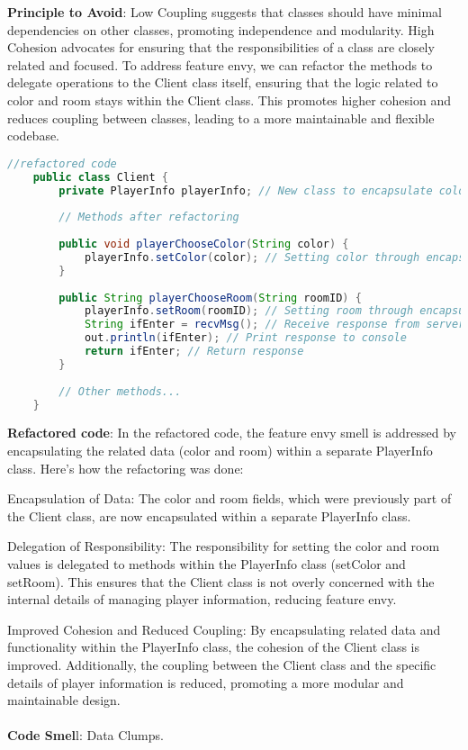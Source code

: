 \documentclass[12pt]{article}
\numberwithin{table}{section}
\begin{document}
\textbf{Principle to Avoid}: Low Coupling suggests that classes should have minimal dependencies on other classes, promoting independence and modularity. High Cohesion advocates for ensuring that the responsibilities of a class are closely related and focused. To address feature envy, we can refactor the methods to delegate operations to the Client class itself, ensuring that the logic related to color and room stays within the Client class. This promotes higher cohesion and reduces coupling between classes, leading to a more maintainable and flexible codebase.
\begin{lstlisting}[language=Java]
	//refactored code
	public class Client {
		private PlayerInfo playerInfo; // New class to encapsulate color and room
		
		// Methods after refactoring
		
		public void playerChooseColor(String color) {
			playerInfo.setColor(color); // Setting color through encapsulated object
		}
		
		public String playerChooseRoom(String roomID) {
			playerInfo.setRoom(roomID); // Setting room through encapsulated object
			String ifEnter = recvMsg(); // Receive response from server
			out.println(ifEnter); // Print response to console
			return ifEnter; // Return response
		}
		
		// Other methods...
	}
\end{lstlisting} 
\textbf{Refactored code}: In the refactored code, the feature envy smell is addressed by encapsulating the related data (color and room) within a separate PlayerInfo class. Here's how the refactoring was done:

Encapsulation of Data:
The color and room fields, which were previously part of the Client class, are now encapsulated within a separate PlayerInfo class.

Delegation of Responsibility:
The responsibility for setting the color and room values is delegated to methods within the PlayerInfo class (setColor and setRoom). This ensures that the Client class is not overly concerned with the internal details of managing player information, reducing feature envy.

Improved Cohesion and Reduced Coupling:
By encapsulating related data and functionality within the PlayerInfo class, the cohesion of the Client class is improved. Additionally, the coupling between the Client class and the specific details of player information is reduced, promoting a more modular and maintainable design.\\
\\
\textbf{Code Smel}l: Data Clumps.
\end{document}
